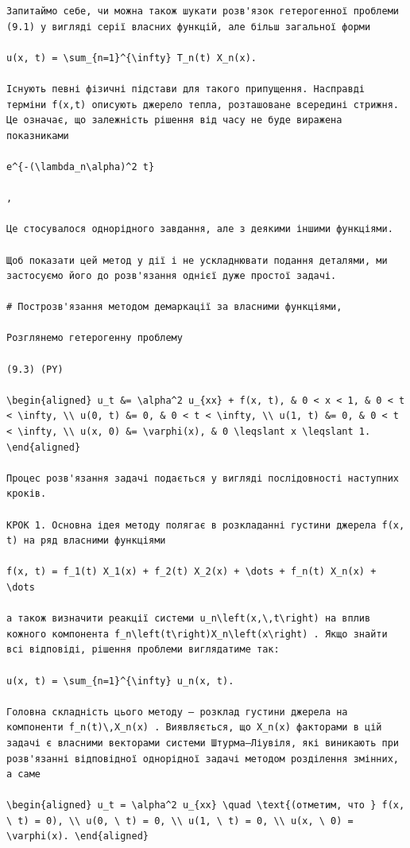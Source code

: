 \documentclass[
  ukrainian,
]{article}
\begin{document}
\begin{verbatim}
Запитаймо себе, чи можна також шукати розв'язок гетерогенної проблеми (9.1) у вигляді серії власних функцій, але більш загальної форми

u(x, t) = \sum_{n=1}^{\infty} T_n(t) X_n(x).

Існують певні фізичні підстави для такого припущення. Насправді терміни f(x,t) описують джерело тепла, розташоване всередині стрижня. Це означає, що залежність рішення від часу не буде виражена показниками

e^{-(\lambda_n\alpha)^2 t}

,

Це стосувалося однорідного завдання, але з деякими іншими функціями.

Щоб показати цей метод у дії і не ускладнювати подання деталями, ми застосуємо його до розв'язання однієї дуже простої задачі.

# Построзв'язання методом демаркації за власними функціями,

Розглянемо гетерогенну проблему

(9.3) (PY)

\begin{aligned} u_t &= \alpha^2 u_{xx} + f(x, t), & 0 < x < 1, & 0 < t < \infty, \\ u(0, t) &= 0, & 0 < t < \infty, \\ u(1, t) &= 0, & 0 < t < \infty, \\ u(x, 0) &= \varphi(x), & 0 \leqslant x \leqslant 1. \end{aligned}

Процес розв'язання задачі подається у вигляді послідовності наступних кроків.

КРОК 1. Основна ідея методу полягає в розкладанні густини джерела f(x, t) на ряд власними функціями

f(x, t) = f_1(t) X_1(x) + f_2(t) X_2(x) + \dots + f_n(t) X_n(x) + \dots

а також визначити реакції системи u_n\left(x,\,t\right) на вплив кожного компонента f_n\left(t\right)X_n\left(x\right) . Якщо знайти всі відповіді, рішення проблеми виглядатиме так:

u(x, t) = \sum_{n=1}^{\infty} u_n(x, t).

Головна складність цього методу — розклад густини джерела на компоненти f_n(t)\,X_n(x) . Виявляється, що X_n(x) факторами в цій задачі є власними векторами системи Штурма–Ліувіля, які виникають при розв'язанні відповідної однорідної задачі методом розділення змінних, а саме

\begin{aligned} u_t = \alpha^2 u_{xx} \quad \text{(отметим, что } f(x, \ t) = 0), \\ u(0, \ t) = 0, \\ u(1, \ t) = 0, \\ u(x, \ 0) = \varphi(x). \end{aligned}


\end{verbatim}
\end{document}
